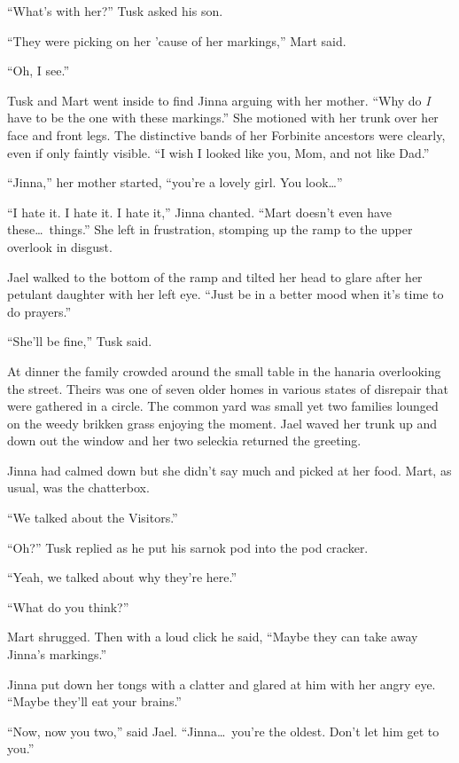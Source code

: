 ``What's with her?'' Tusk asked his son.

``They were picking on her 'cause of her markings,'' Mart said.

``Oh, I see.''

Tusk and Mart went inside to find Jinna arguing with her mother. ``Why do \emph{I} have to be
the one with these markings.'' She motioned with her trunk over her face and front legs. The
distinctive bands of her Forbinite ancestors were clearly, even if only faintly visible. ``I
wish I looked like you, Mom, and not like Dad.''

``Jinna,'' her mother started, ``you're a lovely girl. You look\ldots''

``I hate it. I hate it. I hate it,'' Jinna chanted. ``Mart doesn't even have these\ldots\
things.'' She left in frustration, stomping up the ramp to the upper overlook in disgust.

Jael walked to the bottom of the ramp and tilted her head to glare after her petulant daughter
with her left eye. ``Just be in a better mood when it's time to do prayers.''

``She'll be fine,'' Tusk said.

At dinner the family crowded around the small table in the hanaria overlooking the street.
Theirs was one of seven older homes in various states of disrepair that were gathered in a
circle. The common yard was small yet two families lounged on the weedy brikken grass enjoying
the moment. Jael waved her trunk up and down out the window and her two seleckia returned the
greeting.


Jinna had calmed down but she didn't say much and picked at her food. Mart, as usual, was the
chatterbox.

``We talked about the Visitors.''

``Oh?'' Tusk replied as he put his sarnok pod into the pod cracker.

``Yeah, we talked about why they're here.''

``What do you think?''

Mart shrugged. Then with a loud click he said, ``Maybe they can take away Jinna's markings.''

Jinna put down her tongs with a clatter and glared at him with her angry eye. ``Maybe they'll
eat your brains.''

``Now, now you two,'' said Jael. ``Jinna\ldots\ you're the oldest. Don't let him get to you.''

